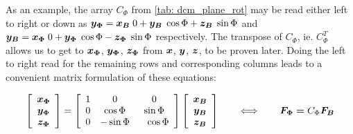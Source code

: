 \documentclass[12pt]{ucthesis}
\begin{document}

As an example, the array $C_{\Phi}$ from \autoref{tab: dcm_plane_rot} may be read either left to right or down as $\boldsymbol{y_{\Phi}} = \boldsymbol{x_B}\;0 + \boldsymbol{y_B}\;\cos\Phi + \boldsymbol{z_B}\;\sin\Phi$ and $\boldsymbol{y_B} = \boldsymbol{x_{\Phi}}\;0 + \boldsymbol{y_{\Phi}}\;\cos\Phi - \boldsymbol{z_{\Phi}}\;\sin\Phi$ respectively. The transpose of $C_{\Phi}$, ie. $C_{\Phi}^{T}$ allows us to get to $\boldsymbol{x_{\Phi}}$, $\boldsymbol{y_{\Phi}}$, $\boldsymbol{z_{\Phi}}$ from $\boldsymbol{x}$, $\boldsymbol{y}$, $\boldsymbol{z}$, to be proven later. Doing the left to right read for the remaining rows and corresponding columns leads to a convenient matrix formulation of these equations:

	\begin{equation}   %
		\left[ \begin{array}{c} \vect{x_{\Phi}} \\ \vect{y_{\Phi}} \\ \vect{z_{\Phi}} \end{array} \right] =
		\left[ \begin{array}{ccc} 1 & 0 & 0 \\ 0 & \cos\Phi & \sin\Phi \\ 0 & -\sin\Phi & \;\;\;\cos\Phi \end{array} \right]
		\left[ \begin{array}{c} \vect{x_B} \\ \vect{y_B} \\ \vect{z_B} \end{array} \right] 
		\qquad\Longleftrightarrow\qquad
		\vect{F_{\Phi}} \boldsymbol{=} C_{\Phi} \vect{F_{B}}
		\label{eq: DCM_y}
	\end{equation}
\end{document}
